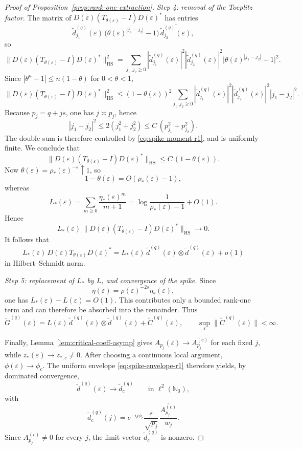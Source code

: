 \documentclass[11pt]{amsart}
\numberwithin{equation}{section}
\theoremstyle{plain}
\theoremstyle{definition}
\theoremstyle{remark}
\begin{document}
\begin{proof}[Proof of Proposition~\ref{prop:rank-one-extraction}]
\smallskip
\noindent
\textit{Step 4: removal of the Toeplitz factor.}
The matrix of
\(D(\varepsilon)(T_{\theta(\varepsilon)}-I)D(\varepsilon)^*\) has entries
\[
\widetilde d^{(q)}_{j_1}(\varepsilon)\,
\bigl(\theta(\varepsilon)^{|j_1-j_2|}-1\bigr)\,
\overline{\widetilde d^{(q)}_{j_2}(\varepsilon)},
\]
so
\[
\|D(\varepsilon)(T_{\theta(\varepsilon)}-I)D(\varepsilon)^*\|_{\mathrm{HS}}^2
=
\sum_{j_1,j_2\ge0}
|\widetilde d^{(q)}_{j_1}(\varepsilon)|^2
|\widetilde d^{(q)}_{j_2}(\varepsilon)|^2
\bigl|\theta(\varepsilon)^{|j_1-j_2|}-1\bigr|^2.
\]
Since \(|\theta^n-1|\le n(1-\theta)\) for \(0<\theta<1\),
\[
\|D(\varepsilon)(T_{\theta(\varepsilon)}-I)D(\varepsilon)^*\|_{\mathrm{HS}}^2
\le
(1-\theta(\varepsilon))^2
\sum_{j_1,j_2\ge0}
|\widetilde d^{(q)}_{j_1}(\varepsilon)|^2
|\widetilde d^{(q)}_{j_2}(\varepsilon)|^2
|j_1-j_2|^2.
\]
Because \(p_j=q+js\), one has \(j\asymp p_j\), hence
\[
|j_1-j_2|^2
\le
2(j_1^2+j_2^2)
\le
C\,(p_{j_1}^2+p_{j_2}^2).
\]
The double sum is therefore controlled by \eqref{eq:spike-moment-r1}, and is
uniformly finite. We conclude that
\[
\|D(\varepsilon)(T_{\theta(\varepsilon)}-I)D(\varepsilon)^*\|_{\mathrm{HS}}
\le
C\,(1-\theta(\varepsilon)).
\]
Now \(\theta(\varepsilon)=\rho_*(\varepsilon)^{-s}\uparrow1\), so
\[
1-\theta(\varepsilon)=O(\rho_*(\varepsilon)-1),
\]
whereas
\[
L_*(\varepsilon)
=
\sum_{m\ge0}\frac{\eta_*(\varepsilon)^m}{m+1}
=
\log\frac{1}{\rho_*(\varepsilon)-1}+O(1).
\]
Hence
\[
L_*(\varepsilon)\,
\|D(\varepsilon)(T_{\theta(\varepsilon)}-I)D(\varepsilon)^*\|_{\mathrm{HS}}
\longrightarrow 0.
\]
It follows that
\[
L_*(\varepsilon)\,
D(\varepsilon)T_{\theta(\varepsilon)}D(\varepsilon)^*
=
L_*(\varepsilon)\,
\widetilde d^{(q)}(\varepsilon)\otimes \widetilde d^{(q)}(\varepsilon)
+
o(1)
\]
in Hilbert--Schmidt norm.

\smallskip
\noindent
\textit{Step 5: replacement of \(L_*\) by \(L\), and convergence of the spike.}
Since
\[
\eta(\varepsilon)=\rho(\varepsilon)^{-2s}\eta_*(\varepsilon),
\]
one has \(L_*(\varepsilon)-L(\varepsilon)=O(1)\). This contributes only a
bounded rank-one term and can therefore be absorbed into the remainder. Thus
\[
\widetilde G^{(q)}(\varepsilon)
=
L(\varepsilon)\,
\widetilde d^{(q)}(\varepsilon)\otimes \widetilde d^{(q)}(\varepsilon)
+
\widetilde C^{(q)}(\varepsilon),
\qquad
\sup_{\varepsilon}\|\widetilde C^{(q)}(\varepsilon)\|<\infty.
\]

Finally, Lemma~\ref{lem:critical-coeff-asymp} gives
\(A_{p_j}(\varepsilon)\to A_{p_j}^{(c)}\) for each fixed \(j\), while
\(z_*(\varepsilon)\to z_{*,c}\neq0\). After choosing a continuous local
argument, \(\phi(\varepsilon)\to\phi_c\). The uniform envelope
\eqref{eq:spike-envelope-r1} therefore yields, by dominated convergence,
\[
\widetilde d^{(q)}(\varepsilon)\to \widetilde d_c^{(q)}
\qquad\text{in }\ell^2(\mathbb N_0),
\]
with
\[
\widetilde d_c^{(q)}(j)
=
e^{-ij\phi_c}\frac{s}{\sqrt{p_j}}\,
\frac{\overline{A_{p_j}^{(c)}}}{w_j}.
\]
Since \(A_{p_j}^{(c)}\neq0\) for every \(j\), the limit vector
\(\widetilde d_c^{(q)}\) is nonzero.
\end{proof}
\end{document}
